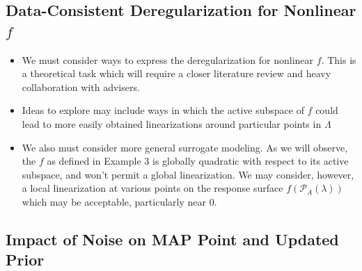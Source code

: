 \documentclass[11pt]{beamer}
\begin{document}
\subsection{Data-Consistent Deregularization for Nonlinear $f$}

\begin{frame}

\begin{itemize}

	\item We must consider ways to express the deregularization for nonlinear $f$. This is a theoretical task which will require a closer literature review and heavy collaboration with advisers.

	\item Ideas to explore may include ways in which the active subspace of $f$ could lead to more easily obtained linearizations around particular points in $\Lambda$
	
	\item We also must consider more general surrogate modeling. As we will observe, the $f$ as defined in Example 3 is globally quadratic with respect to its active subspace, and won't permit a global linearization. We may consider, however, a local linearization at various points on the response surface $f(\mathcal{P}_A(\lambda))$ which may be acceptable, particularly near 0.

\end{itemize}

\end{frame}

\subsection{Impact of Noise on MAP Point and Updated Prior}
\end{document}
